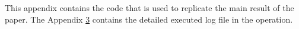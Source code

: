 \documentclass[12pt]{jfm}
\begin{document}
\section{}

\newpage




\newpage
\appendix

\section{}\label{appA}

This appendix contains the code that is used to replicate the main result of the paper. The Appendix \ref{appB} contains the detailed executed log file in the operation.

\section{}\label{appB}
\end{document}
